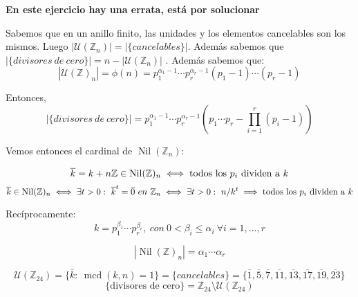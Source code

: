 \documentclass[openany]{book}
\begin{document}
\begin{exercise}$  $

    \begin{flushright}
        \textbf{En este ejercicio hay una errata, está por solucionar}
    \end{flushright}

    Sabemos que en un anillo finito, las unidades y los elementos cancelables son los mismos. Luego $ |\mathcal{U}(\mathbb{Z}_{n})| = |\{cancelables\}|$. Además sabemos que $ |\{divisores\ de\ cero\}| = n - |\mathcal{U}(\mathbb{Z}_{n})|  $ . Además sabemos que:
    $$ |\mathcal{U}(\mathbb{Z})_{n}| = \phi(n ) = p_1^{\alpha_1-1}\cdots p_{r}^{\alpha_{r}-1} (p_1-1)\cdots (p_{r}-1) $$

    Entonces,
    $$ |\{divisores\ de\ cero\}| = p_1^{\alpha_1-1} \cdots p_{r}^{\alpha_{r}-1} (p_1\cdots p_{r}- \prod_{i=1}^{r}(p_i-1)) $$

    Vemos entonces el cardinal de $ \operatorname{Nil}(\mathbb{Z}_{n}) $:

    $$ \overline{k} = k+n\mathbb{Z} \in  \operatorname{Nil}(\mathbb{Z})_{n} \iff \text{todos los $  p_i$ dividen a }k $$
    $$ \overline{k} \in \operatorname{Nil}(\mathbb{Z})_{n} \iff \exists t>0:\ \overline{k}^{t} = \overline{0}\ en\ \mathbb{Z}_{n}\iff \exists t>0:\ n/k^{t} \implies \text{todos los $ p_i $ dividen a }k$$

    Recíprocamente:
    $$ k = p_1^{\beta_1}\cdots p_{r}^{\beta_{r}},\ con\ 0<\beta_i \leq  \alpha_i\ \forall i = 1,...,r $$

    $$ |\operatorname{Nil}(\mathbb{Z})_{n}| = \alpha_1\cdots \alpha_{r} $$
\end{exercise}


\begin{exercise}
    $$ \mathcal{U}(\mathbb{Z}_{24}) = \{\overline{k}:\ \operatorname{mcd}(k,n) = 1\} = \{cancelables\} = \{\overline{1},\overline{5},\overline{7},\overline{11},\overline{13},\overline{17},\overline{19},\overline{23}\} $$
    $$ \{\text{divisores de cero}\} = \mathbb{Z}_{24} \setminus \mathcal{U}(\mathbb{Z}_{24}) $$


\end{exercise}

\setcounter{ex}{5}
\end{document}
